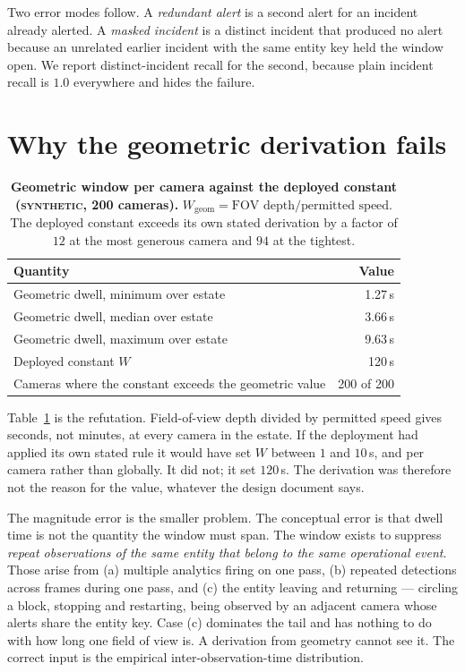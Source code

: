 \documentclass[11pt,a4paper]{article}
\newcommand{\synth}{\textsc{synthetic}}
\begin{document}
Two error modes follow. A \emph{redundant alert} is a second alert for an incident
already alerted. A \emph{masked incident} is a distinct incident that produced no
alert because an unrelated earlier incident with the same entity key held the
window open. We report distinct-incident recall for the second, because plain
incident recall is $1.0$ everywhere and hides the failure.

\section{Why the geometric derivation fails}
\label{sec:refute}

\begin{table}[t]
\centering\small
\begin{tabular}{lr}
\toprule
\textbf{Quantity} & \textbf{Value} \\
\midrule
Geometric dwell, minimum over estate & 1.27\,s \\
Geometric dwell, median over estate & 3.66\,s \\
Geometric dwell, maximum over estate & 9.63\,s \\
Deployed constant $W$ & 120\,s \\
Cameras where the constant exceeds the geometric value & 200 of 200 \\
\bottomrule
\end{tabular}
\caption{\textbf{Geometric window per camera against the deployed constant
(\synth, 200 cameras).} $W_{\text{geom}} = \text{FOV depth} / \text{permitted
speed}$. The deployed constant exceeds its own stated derivation by a factor of
$12$ at the most generous camera and $94$ at the tightest.}
\label{tab:geom}
\end{table}

Table~\ref{tab:geom} is the refutation. Field-of-view depth divided by permitted
speed gives seconds, not minutes, at every camera in the estate. If the deployment
had applied its own stated rule it would have set $W$ between $1$ and $10$\,s, and
per camera rather than globally. It did not; it set $120$\,s. The derivation was
therefore not the reason for the value, whatever the design document says.

The magnitude error is the smaller problem. The conceptual error is that dwell
time is not the quantity the window must span. The window exists to suppress
\emph{repeat observations of the same entity that belong to the same operational
event}. Those arise from (a) multiple analytics firing on one pass, (b) repeated
detections across frames during one pass, and (c) the entity leaving and returning
--- circling a block, stopping and restarting, being observed by an adjacent
camera whose alerts share the entity key. Case (c) dominates the tail and has
nothing to do with how long one field of view is. A derivation from geometry
cannot see it. The correct input is the empirical inter-observation-time
distribution.
\end{document}
